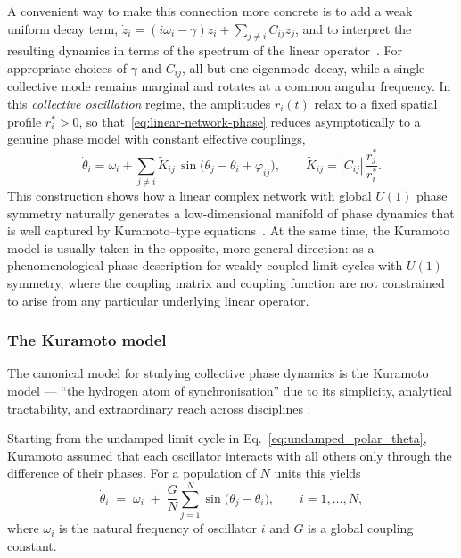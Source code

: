 \documentclass[12pt]{article}
\numberwithin{equation}{section}
\begin{document}
A convenient way to make this connection more concrete is to add a weak uniform decay term, $\dot z_i = (i\omega_i - \gamma) z_i + \sum_{j\neq i} C_{ij}z_j$, and to interpret the resulting dynamics in terms of the spectrum of the linear operator~\cite{Roberts2008,Conteville2013}. For appropriate choices of $\gamma$ and $C_{ij}$, all but one eigenmode decay, while a single collective mode remains marginal and rotates at a common angular frequency. In this \emph{collective oscillation} regime, the amplitudes $r_i(t)$ relax to a fixed spatial profile $r_i^\ast>0$, so that~\eqref{eq:linear-network-phase} reduces asymptotically to a genuine phase model with constant effective couplings,
\begin{equation}
    \dot\theta_i
    =
    \omega_i
    +
    \sum_{j\neq i}
      \tilde K_{ij}\,
      \sin\!\bigl(\theta_j-\theta_i+\varphi_{ij}\bigr),
    \qquad
    \tilde K_{ij} = |C_{ij}|\,\frac{r_j^\ast}{r_i^\ast}.
    \label{eq:kuramoto-effective-coupling}
\end{equation}
This construction shows how a linear complex network with global $U(1)$ phase symmetry naturally generates a low‑dimensional manifold of phase dynamics that is well captured by Kuramoto–type equations~\cite{Kuramoto1984,Nakao2016,Pietras2019}. At the same time, the Kuramoto model is usually taken in the opposite, more general direction: as a phenomenological phase description for weakly coupled limit cycles with $U(1)$ symmetry, where the coupling matrix and coupling function are not constrained to arise from any particular underlying linear operator.




\subsubsection{The Kuramoto model}
 

The canonical model for studying collective phase dynamics is the Kuramoto model ---  “the hydrogen atom of synchronisation” due to its simplicity, analytical tractability, and extraordinary reach across disciplines 
\cite{kuramotoSelfentrainmentPopulationCoupled1975,Winfree2001,strogatz_nonlinear_2015,acebronKuramotoModelSimple2005}. %

Starting from the undamped limit cycle in Eq.~\eqref{eq:undamped_polar_theta}, Kuramoto assumed that each oscillator interacts with all others only through the difference of their phases.  For a population of $N$ units this yields  
\begin{equation}
    \dot{\theta}_{i}
    \;=\;
    \omega_{i}
    \;+\;
    \frac{G}{N}
    \sum_{j=1}^{N}
    \sin\!\bigl(\theta_{j}-\theta_{i}\bigr),
    \qquad
    i=1,\dots,N,
    \label{eq:kuramoto_original}
\end{equation}
where $\omega_{i}$ is the natural frequency of oscillator $i$ and $G$ is a global coupling constant.
\end{document}
